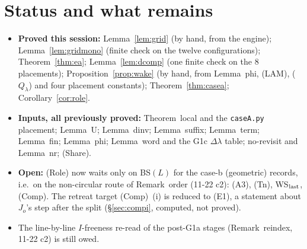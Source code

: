 \documentclass[11pt]{article}
\theoremstyle{definition}\newtheorem{definition}[theorem]{Definition}\newtheorem{remark}[theorem]{Remark}
\begin{document}
\section{Status and what remains}
\begin{itemize}
\item \textbf{Proved this session:} Lemma~\ref{lem:grid} (by hand, from the engine); Lemma~\ref{lem:gridmono} (finite check on the twelve configurations); Theorem~\ref{thm:ea}; Lemma~\ref{lem:dcomp} (one finite check on the 8 placements); Proposition~\ref{prop:wake} (by hand, from Lemma~phi, (LAM), ($Q_\lambda$) and four placement constants); Theorem~\ref{thm:casea}; Corollary~\ref{cor:role}.
\item \textbf{Inputs, all previously proved:} Theorem~local and the \texttt{caseA.py} placement; Lemma~U; Lemma~dinv; Lemma~suffix; Lemma~term; Lemma~fin; Lemma~phi; Lemma~word and the G1c $\Delta\lambda$ table; no-revisit and Lemma~nr; (Share).
\item \textbf{Open:} (Role) now waits only on BS$(L)$ for the case-b (geometric) records, i.e.\ on the non-circular route of Remark~order (11-22 c2): (A3), (Tn), WS$_{\rm last}$, (Comp). The retreat target (Comp)~(i) is reduced to (E1), a statement about $J_o$'s step after the split (\S\ref{sec:compi}, computed, not proved).
\item The line-by-line $I$-freeness re-read of the post-G1a stages (Remark~reindex, 11-22 c2) is still owed.
\end{itemize}
\end{document}
